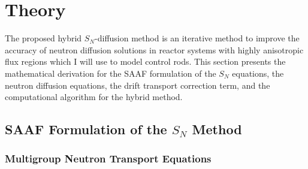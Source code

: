 \section{Theory} \label{sec:theory}

The proposed hybrid $S_N$-diffusion method is an iterative method to improve the
accuracy of neutron diffusion solutions in reactor systems with highly anisotropic flux regions
which I will use to model control rods. This section presents the mathematical derivation for the
\gls{SAAF} formulation of the $S_N$ equations, the neutron diffusion equations, the drift
transport correction term, and the computational algorithm for the hybrid method.

\subsection{\gls{SAAF} Formulation of the $S_N$ Method}

\subsubsection{Multigroup Neutron Transport Equations}

